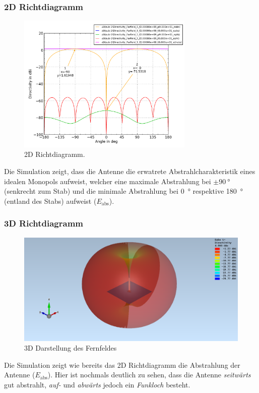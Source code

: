\newpage
\subsubsection{2D Richtdiagramm}

\begin{figure}[h!]
	\centering
	\includegraphics[width=0.75\textwidth]{../fig/plt/monopol_a_sim_2d_pattern.png}
	\caption{2D Richtdiagramm.}
\end{figure}

Die Simulation zeigt, dass die Antenne die erwatrete Abstrahlcharakteristik
eines idealen Monopols aufweist, welcher eine maximale Abstrahlung bei
$\pm \SI{90}{\degree}$ (senkrecht zum Stab) und die minimale Abstrahlung
bei \SI{0}{\degree} respektive \SI{180}{\degree} (entland des Stabs)
aufweist ($E_{\mathrm{abs}}$).

\newpage
\subsubsection{3D Richtdiagramm}

\begin{figure}[h!]
	\centering
		\includegraphics[width=1\textwidth]{../fig/plt/monopol_a_sim_3d_eabs.png}
	\caption{3D Darstellung des Fernfeldes}
\end{figure}

Die Simulation zeigt wie bereits das 2D Richtdiagramm die Abstrahlung
der Antenne ($E_{\mathrm{abs}}$). Hier ist nochmals deutlich zu sehen,
dass die Antenne \emph{seitwärts} gut abstrahlt, \emph{auf-} und
\emph{abwärts} jedoch ein \emph{Funkloch} besteht.
